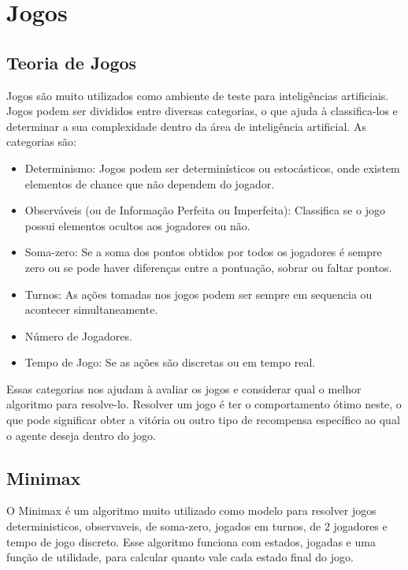 \section{\label{sec:secao1}Jogos}

\subsection{\label{sec:secao1.1}Teoria de Jogos}

Jogos são muito utilizados como ambiente de teste para inteligências artificiais. Jogos podem ser divididos entre diversas categorias, o que ajuda à classifica-los e determinar a sua complexidade dentro da área de inteligência artificial. As categorias são:

\begin{itemize}

   \item Determinismo: Jogos podem ser determinísticos ou estocásticos, onde existem elementos de chance que não dependem do jogador. 
   \item Observáveis (ou de Informação Perfeita ou Imperfeita): Classifica se o jogo possui elementos ocultos aos jogadores ou não.
   \item Soma-zero: Se a soma dos pontos obtidos por todos os jogadores é sempre zero ou se pode haver diferenças entre a pontuação, sobrar ou faltar pontos.
   \item Turnos: As ações tomadas nos jogos podem ser sempre em sequencia ou acontecer simultaneamente.
   \item Número de Jogadores.
   \item Tempo de Jogo: Se as ações são discretas ou em tempo real.
   
\end{itemize}
   
Essas categorias nos ajudam à avaliar os jogos e considerar qual o melhor algoritmo para resolve-lo. Resolver um jogo é ter o comportamento ótimo neste, o que pode significar obter a vitória ou outro tipo de recompensa específico ao qual o agente deseja dentro do jogo.

\subsection{\label{sec:secao1.2}Minimax}

O Minimax é um algoritmo muito utilizado como modelo para resolver jogos deterministicos, observaveis, de soma-zero, jogados em turnos, de 2 jogadores e tempo de jogo discreto.  
Esse algoritmo funciona com estados, jogadas e uma função de utilidade, para calcular quanto vale cada estado final do jogo.

